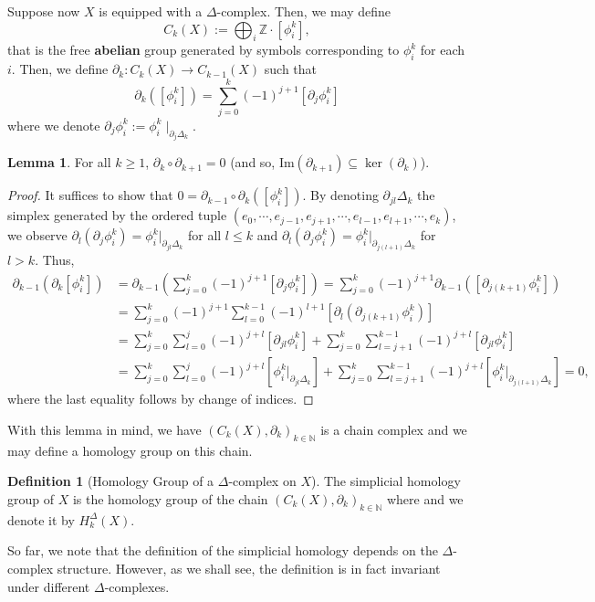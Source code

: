 \documentclass[]{article}
\theoremstyle{definition}
\theoremstyle{definition}
\newtheorem{definition}{Definition}[section]
\newtheorem{lemma}{Lemma}[section]
\begin{document}
Suppose now \(X\) is equipped with a \(\Delta\)-complex. Then, we may define 
\[C_k(X) := \bigoplus_i \mathbb{Z} \cdot [\phi_i^k],\]
that is the free \textbf{abelian} group generated by symbols corresponding to 
\(\phi_i^k\) for each \(i\). Then, we define \(\partial_k : C_k(X) \to C_{k - 1}(X)\)
such that 
\[\partial_k([\phi_i^k]) = \sum_{j = 0}^k (-1)^{j + 1}[\partial_j \phi_i^k]\]
where we denote \(\partial_j \phi_i^k := \phi_i^k \mid_{\partial_j \Delta_k}\).

\begin{lemma}
  For all \(k \ge 1\), \(\partial_k \circ \partial_{k + 1} = 0\) (and so, 
  \(\text{Im}(\partial_{k + 1}) \subseteq \ker(\partial_k)\)).
\end{lemma}
\begin{proof}
  It suffices to show that \(0 = \partial_{k - 1} \circ \partial_k([\phi_i^k])\).
  By denoting \(\partial_{jl}\Delta_k\) the simplex generated by the ordered 
  tuple \((e_0, \cdots, e_{j - 1}, e_{j + 1}, \cdots, e_{l - 1}, e_{l + 1}, \cdots, e_k)\),
  we observe \(\partial_l (\partial_j \phi_i^k) = \phi_i^k |_{\partial_{jl} \Delta_k}\) for 
  all \(l \le k\) and \(\partial_l(\partial_j \phi_i^k) = \phi_i^k |_{\partial_{j(l+1)}\Delta_k}\) 
  for \(l > k\). Thus, 
  \[\begin{split}
    \partial_{k - 1}(\partial_k [\phi_i^k]) 
    & = \partial_{k - 1}\left(\sum_{j = 0}^k (-1)^{j + 1}[\partial_j \phi_i^k]\right)
      = \sum_{j = 0}^k (-1)^{j + 1}\partial_{k - 1}([\partial_{j(k+1)} \phi_i^k])\\
    & = \sum_{j = 0}^k (-1)^{j + 1}\sum_{l = 0}^{k - 1}(-1)^{l + 1}
      [\partial_l(\partial_{j(k+1)} \phi_i^k)]\\
    & = \sum_{j = 0}^k \sum_{l = 0}^{j}(-1)^{j + l}
      [\partial_{jl} \phi_i^k] 
      + \sum_{j = 0}^k \sum_{l = j + 1}^{k - 1}(-1)^{j + l}
      [\partial_{jl} \phi_i^k]\\
    & = \sum_{j = 0}^k \sum_{l = 0}^{j}(-1)^{j + l}
      [\phi_i^k |_{\partial_{jl} \Delta_k}] 
      + \sum_{j = 0}^k \sum_{l = j + 1}^{k - 1}(-1)^{j + l}
      [\phi_i^k |_{\partial_{j(l+1)}\Delta_k}] = 0,
  \end{split}\]
  where the last equality follows by change of indices. 
\end{proof}

With this lemma in mind, we have \((C_k(X), \partial_k)_{k \in \mathbb{N}}\) 
is a chain complex and we may define a homology group on this chain.

\begin{definition}[Homology Group of a \(\Delta\)-complex on \(X\)]
  The simplicial homology group of \(X\) is the homology group of the chain 
  \((C_k(X), \partial_k)_{k \in \mathbb{N}}\) where and we denote it by 
  \(H^\Delta_k(X)\).
\end{definition}

So far, we note that the definition of the simplicial homology depends on the 
\(\Delta\)-complex structure. However, as we shall see, the definition 
is in fact invariant under different \(\Delta\)-complexes. 
\end{document}
